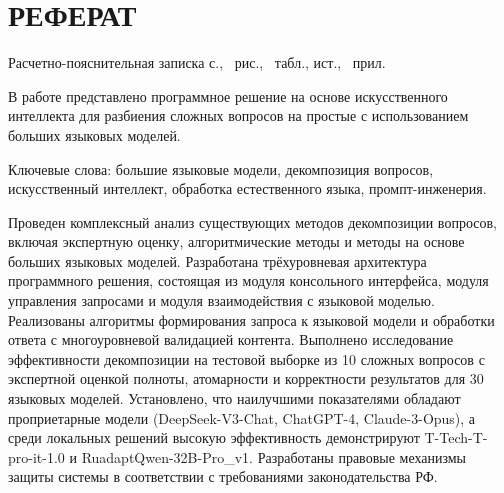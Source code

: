 \part*{РЕФЕРАТ}

Расчетно-пояснительная записка \pageref{LastPage} с., \totalfigures\ рис., \totaltables\ табл.,  ист., \ прил.

В работе представлено программное решение на основе искусственного интеллекта для разбиения сложных вопросов на простые с использованием больших языковых моделей.

Ключевые слова: большие языковые модели, декомпозиция вопросов, искусственный интеллект, обработка естественного языка, промпт-инженерия.

Проведен комплексный анализ существующих методов декомпозиции вопросов, включая экспертную оценку, алгоритмические методы и методы на основе больших языковых моделей. Разработана трёхуровневая архитектура программного решения, состоящая из модуля консольного интерфейса, модуля управления запросами и модуля взаимодействия с языковой моделью. Реализованы алгоритмы формирования запроса к языковой модели и обработки ответа с многоуровневой валидацией контента. Выполнено исследование эффективности декомпозиции на тестовой выборке из 10 сложных вопросов с экспертной оценкой полноты, атомарности и корректности результатов для 30 языковых моделей. Установлено, что наилучшими показателями обладают проприетарные модели (DeepSeek-V3-Chat, ChatGPT-4, Claude-3-Opus), а среди локальных решений высокую эффективность демонстрируют T-Tech-T-pro-it-1.0 и RuadaptQwen-32B-Pro\_v1. Разработаны правовые механизмы защиты системы в соответствии с требованиями законодательства РФ.
